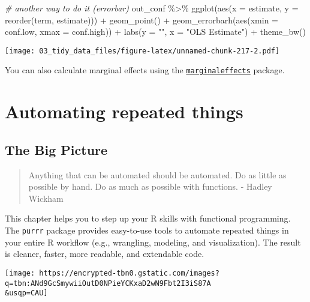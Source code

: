 \documentclass[
]{book}
\newenvironment{Shaded}{\begin{snugshade}}{\end{snugshade}}
\newcommand{\AttributeTok}[1]{\textcolor[rgb]{0.77,0.63,0.00}{#1}}
\newcommand{\CommentTok}[1]{\textcolor[rgb]{0.56,0.35,0.01}{\textit{#1}}}
\newcommand{\FunctionTok}[1]{\textcolor[rgb]{0.00,0.00,0.00}{#1}}
\newcommand{\NormalTok}[1]{#1}
\newcommand{\SpecialCharTok}[1]{\textcolor[rgb]{0.00,0.00,0.00}{#1}}
\newcommand{\StringTok}[1]{\textcolor[rgb]{0.31,0.60,0.02}{#1}}
\begin{document}
\begin{Shaded}
\begin{Highlighting}[]
\CommentTok{\# another way to do it (errorbar)}
\NormalTok{out\_conf }\SpecialCharTok{\%\textgreater{}\%}
  \FunctionTok{ggplot}\NormalTok{(}\FunctionTok{aes}\NormalTok{(}\AttributeTok{x =}\NormalTok{ estimate, }\AttributeTok{y =} \FunctionTok{reorder}\NormalTok{(term, estimate))) }\SpecialCharTok{+}
  \FunctionTok{geom\_point}\NormalTok{() }\SpecialCharTok{+}
  \FunctionTok{geom\_errorbarh}\NormalTok{(}\FunctionTok{aes}\NormalTok{(}\AttributeTok{xmin =}\NormalTok{ conf.low, }\AttributeTok{xmax =}\NormalTok{ conf.high)) }\SpecialCharTok{+}
  \FunctionTok{labs}\NormalTok{(}\AttributeTok{y =} \StringTok{""}\NormalTok{, }\AttributeTok{x =} \StringTok{"OLS Estimate"}\NormalTok{) }\SpecialCharTok{+}
  \FunctionTok{theme\_bw}\NormalTok{()}
\end{Highlighting}
\end{Shaded}

\texttt{[image: 03\_tidy\_data\_files/figure-latex/unnamed-chunk-217-2.pdf]}

You can also calculate marginal effects using the \href{https://vincentarelbundock.github.io/marginaleffects/}{\texttt{marginaleffects}} package.

\hypertarget{functional_programming}{%
\chapter{Automating repeated things}\label{functional_programming}}

\hypertarget{the-big-picture-6}{%
\section{The Big Picture}\label{the-big-picture-6}}

\begin{quote}
Anything that can be automated should be automated. Do as little as possible by hand. Do as much as possible with functions.
- Hadley Wickham
\end{quote}

This chapter helps you to step up your R skills with functional programming. The \texttt{purrr} package provides easy-to-use tools to automate repeated things in your entire R workflow (e.g., wrangling, modeling, and visualization). The result is cleaner, faster, more readable, and extendable code.

\texttt{[image: https://encrypted-tbn0.gstatic.com/images?q=tbn:ANd9GcSmywiiOutD0NPieYCKxaD2wN9Fbt2I3iS87A\\\&usqp=CAU]}
\end{document}
